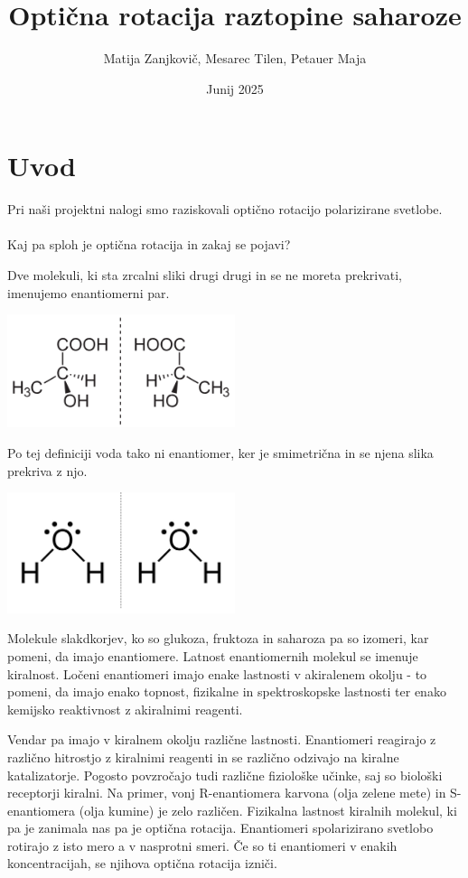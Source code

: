 \documentclass[a4paper,12pt]{article}
\title{Optična rotacija raztopine saharoze}
\author{Matija Zanjkovič, Mesarec Tilen, Petauer Maja}
\date{Junij 2025}
\begin{document}
\maketitle

\section*{Uvod}

Pri naši projektni nalogi smo raziskovali optično rotacijo polarizirane svetlobe. \\\\

Kaj pa sploh je optična rotacija in zakaj se pojavi?

Dve molekuli, ki sta zrcalni sliki drugi drugi in se ne moreta prekrivati, imenujemo enantiomerni par.
\begin{center}
    \includegraphics[width=0.5\textwidth]{slike/enantiomer.png}
\end{center}

Po tej definiciji voda tako ni enantiomer, ker je smimetrična in se njena slika prekriva z njo.
\begin{center}
    \includegraphics[width=0.5\textwidth]{slike/voda.png}
\end{center}

Molekule slakdkorjev, ko so glukoza, fruktoza in saharoza pa so izomeri, kar pomeni, da imajo enantiomere. Latnost enantiomernih molekul 
se imenuje kiralnost.
Ločeni enantiomeri imajo enake lastnosti v akiralenem okolju - to pomeni, da imajo enako topnost, fizikalne in spektroskopske lastnosti ter enako kemijsko reaktivnost z akiralnimi reagenti.

Vendar pa imajo v kiralnem okolju različne lastnosti. Enantiomeri reagirajo z različno hitrostjo z kiralnimi reagenti in se različno odzivajo na kiralne katalizatorje. Pogosto povzročajo tudi različne fiziološke učinke, saj so biološki receptorji kiralni.
Na primer, vonj R-enantiomera karvona (olja zelene mete) in S-enantiomera (olja kumine) je zelo različen. Fizikalna lastnost kiralnih molekul, ki pa je zanimala nas pa je optična rotacija.
Enantiomeri spolarizirano svetlobo rotirajo z isto mero a v nasprotni smeri. Če so ti enantiomeri v enakih koncentracijah, se njihova optična rotacija izniči.
\end{document}
